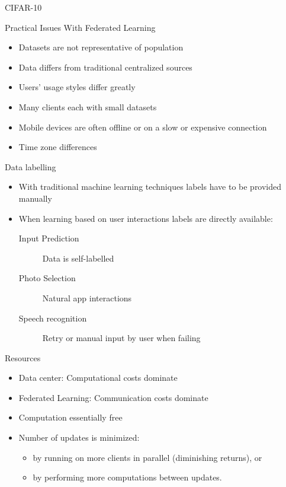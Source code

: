 \documentclass{beamer}{}
\begin{document}
    \begin{frame} {CIFAR-10}
    \end{frame}
    \begin{frame} {Practical Issues With Federated Learning}
        \begin{itemize}[<+->]
            \item Datasets are not representative of population
            \item Data differs from traditional centralized sources
            \item Users' usage styles differ greatly
            \item Many clients each with small datasets
            \item Mobile devices are often offline or on a slow or expensive connection
            \item Time zone differences
        \end{itemize}
    \end{frame}
    \begin{frame} {Data labelling}
        \begin{itemize}[<+->]
            \item With traditional machine learning techniques labels have to be provided manually
            \item When learning based on user interactions labels are directly available:
            \begin{description}
                \item[Input Prediction] Data is self-labelled
                \item[Photo Selection] Natural app interactions
                \item[Speech recognition] Retry or manual input by user when failing
            \end{description}
        \end{itemize}
    \end{frame}
    \begin{frame} {Resources}
        \begin{itemize}[<+->]
            \item Data center: Computational costs dominate
            \item Federated Learning: Communication costs dominate
            \item Computation essentially free
            \item Number of updates is minimized:
            \begin{itemize}
                \item by running on more clients in parallel (diminishing returns), or
                \item by performing more computations between updates.
            \end{itemize}
        \end{itemize}
    \end{frame}
\end{document}
